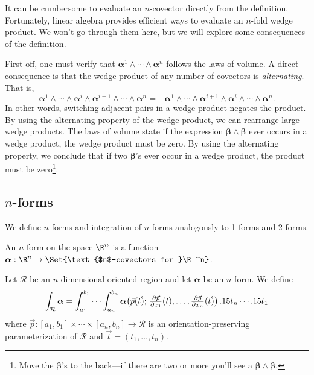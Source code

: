 It can be cumbersome to evaluate an $n$-covector directly from the definition.
Fortunately, linear algebra provides
efficient ways to evaluate an $n$-fold
wedge product.  We won't go through them here, but we will explore
some consequences of the definition.

First off, one must verify that $\bm\alpha^1\wedge\cdots \wedge \bm\alpha^n$
follows the laws of volume.  A direct consequence is that the wedge
product of any number of covectors is \emph{alternating}.
That is,
\[
\bm\alpha^1\wedge \cdots \wedge 
		\bm\alpha^{i}\wedge \bm\alpha^{i+1}\wedge \cdots \wedge \bm\alpha^n
=
-\bm\alpha^1\wedge \cdots \wedge
		\bm\alpha^{i+1}\wedge \bm\alpha^{i}\wedge \cdots \wedge \bm\alpha^n.
\]
In other words, switching adjacent pairs in a wedge product negates the product.  
By using the alternating
property of the wedge product, we can rearrange large wedge products.   
The laws of volume state if the expression $\bm\beta\wedge\bm\beta$
ever occurs in a wedge product, the wedge product must be zero.
By using the alternating
property, we conclude that if two $\bm\beta$'s ever occur in a wedge product, the product must be zero\footnote{
Move the $\bm\beta$'s to the back---if there are two or more you'll see a $\bm\beta\wedge\bm\beta$.}.

\subsection{$n$-forms}
We define $n$-forms and integration of $n$-forms
analogously to 1-forms and 2-forms.

\begin{definition}[$n$-form]
	An $n$-form on the space $\R^n$ is a function $\bm\alpha:\R^n
	\to\Set{\text{$n$-covectors for }\R^n}$.
\end{definition}
\begin{definition}
	Let $\mathcal R$ be an $n$-dimensional oriented region
	and let $\bm\alpha$ be an $n$-form.  We define
	\[
		\int_{\mathcal R} \bm\alpha = \int_{a_1}^{b_1}\cdots
		\int_{a_n}^{b_n} \bm\alpha\formarg{
		\vec p(\vec t)}{
			\tfrac{\partial \vec p}{\partial x_1}(\vec t),
			\ldots,
			\tfrac{\partial \vec p}{\partial x_n}(\vec t)
		} \,\d t_n\cdots \d t_1
	\]
	where $\vec p:[a_1,b_1]\times\cdots\times[a_n,b_n]\to\mathcal R$
	is an orientation-preserving parameterization of $\mathcal R$ and
	$\vec t=(t_1,\ldots, t_n)$.
\end{definition}


